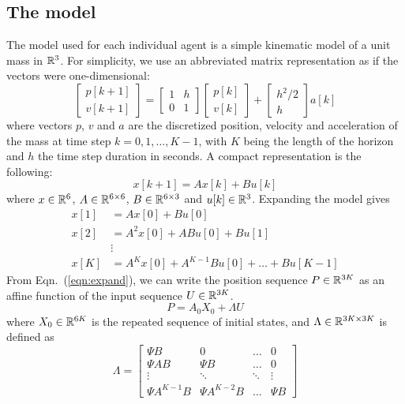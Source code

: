 \subsection{The model}
The model used for each individual agent is a simple kinematic model of a unit mass in ${\mathbb R}^3$. For simplicity, we use an abbreviated matrix representation as if the vectors were one-dimensional:
\begin{equation}
\label{eqn: model}
\begin{bmatrix}
p[k+1]\\
v[k+1]
\end{bmatrix} = \begin{bmatrix}
1 & h\\
0 & 1
\end{bmatrix} \begin{bmatrix}
p[k] \\
v[k]
\end{bmatrix} + \begin{bmatrix}
h^2/2 \\
h
\end{bmatrix}a[k]
\end{equation}
where vectors $p$, $v$ and $a$ are the discretized position, velocity and acceleration of the mass at time step $k = {0,1,\ldots,K-1}$, with $K$ being the length of the horizon and $h$ the time step duration in seconds. A compact representation is the following:
\begin{equation}
x[k+1] = Ax[k] + Bu[k] 
\end{equation}
where $x \in {\mathbb R}^{6}$, $A \in {\mathbb R}^{6\times 6} $, $B \in {\mathbb R}^{6\times 3}$ and $u[k] \in {\mathbb R}^{3}$. Expanding the model gives
\begin{equation}
\label{eqn:expand}
\begin{aligned}
x[1] &= Ax[0] + Bu[0]\\
x[2] &= A^2x[0] + ABu[0] + Bu[1]\\
&\vdots\\
x[K] &= A^{K}x[0] + A^{K-1}Bu[0] + \ldots + Bu[K-1]
\end{aligned}
\end{equation}
From Eqn.~(\ref{eqn:expand}), we can write the position sequence $P \in {\mathbb R}^{3K}$ as an affine function of the input sequence $U \in {\mathbb R}^{3K}$.
\begin{equation}
\label{eqn:model}
P = A_0X_0 + \Lambda U
\end{equation}
where $X_0 \in {\mathbb R}^{6K}$ is the repeated sequence of initial states, and $\Lambda \in {\mathbb R}^{3K \times 3K}$ is defined as
\begin{equation}
\Lambda = \begin{bmatrix}
\Psi B & 0 & \ldots & 0\\
\Psi AB & \Psi B & \ldots & 0 \\
\vdots & \ddots & \ddots & \vdots \\
\Psi A^{K-1}B & \Psi A^{K-2}B & \dots & \Psi B 
\end{bmatrix}
\end{equation}
